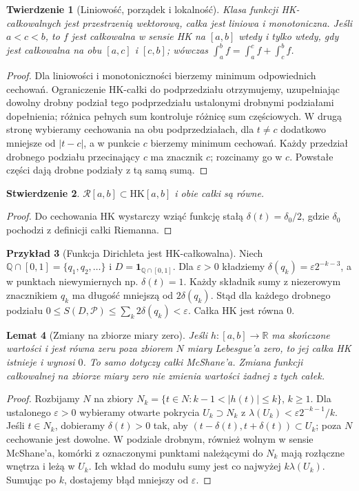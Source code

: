 \documentclass[11pt,a4paper]{article}
\numberwithin{equation}{section}
\theoremstyle{plain}
\newtheorem{twierdzenie}{Twierdzenie}[section]
\newtheorem{lemat}[twierdzenie]{Lemat}
\newtheorem{stwierdzenie}[twierdzenie]{Stwierdzenie}
\theoremstyle{definition}
\newtheorem{przyklad}[twierdzenie]{Przykład}
\theoremstyle{remark}
\newcommand{\R}{\mathbb R}
\newcommand{\Q}{\mathbb Q}
\newcommand{\ind}[1]{\mathbf 1_{#1}}
\newcommand{\HK}{\mathrm{HK}}
\begin{document}
\begin{twierdzenie}[Liniowość, porządek i lokalność]
Klasa funkcji HK-całkowalnych jest przestrzenią wektorową, całka jest liniowa i monotoniczna. Jeśli $a<c<b$, to $f$ jest całkowalna w sensie HK na $[a,b]$ wtedy i tylko wtedy, gdy jest całkowalna na obu $[a,c]$ i $[c,b]$; wówczas $\int_a^b f=\int_a^c f+\int_c^b f$.
\end{twierdzenie}
\begin{proof}
Dla liniowości i monotoniczności bierzemy minimum odpowiednich cechowań. Ograniczenie HK-całki do podprzedziału otrzymujemy, uzupełniając dowolny drobny podział tego podprzedziału ustalonymi drobnymi podziałami dopełnienia; różnica pełnych sum kontroluje różnicę sum częściowych. W drugą stronę wybieramy cechowania na obu podprzedziałach, dla $t\ne c$ dodatkowo mniejsze od $|t-c|$, a w punkcie $c$ bierzemy minimum cechowań. Każdy przedział drobnego podziału przecinający $c$ ma znacznik $c$; rozcinamy go w $c$. Powstałe części dają drobne podziały z tą samą sumą.
\end{proof}
\begin{stwierdzenie}
$\mathcal R[a,b]\subset\HK[a,b]$ i obie całki są równe.
\end{stwierdzenie}
\begin{proof}
Do cechowania HK wystarczy wziąć funkcję stałą $\delta(t)=\delta_0/2$, gdzie $\delta_0$ pochodzi z definicji całki Riemanna.
\end{proof}
\begin{przyklad}[Funkcja Dirichleta jest HK-całkowalna]
Niech $\Q\cap[0,1]=\{q_1,q_2,\dots\}$ i $D=\ind{\Q\cap[0,1]}$. Dla $\varepsilon>0$ kładziemy $\delta(q_k)=\varepsilon 2^{-k-3}$, a w punktach niewymiernych np. $\delta(t)=1$. Każdy składnik sumy z niezerowym znacznikiem $q_k$ ma długość mniejszą od $2\delta(q_k)$. Stąd dla każdego drobnego podziału $0\le S(D,\mathcal P)\le\sum_k 2\delta(q_k)<\varepsilon$. Całka HK jest równa $0$.
\end{przyklad}
\begin{lemat}[Zmiany na zbiorze miary zero]
Jeśli $h:[a,b]\to\R$ ma skończone wartości i jest równa zeru poza zbiorem $N$ miary Lebesgue'a zero, to jej całka HK istnieje i wynosi $0$. To samo dotyczy całki McShane'a. Zmiana funkcji całkowalnej na zbiorze miary zero nie zmienia wartości żadnej z tych całek.
\end{lemat}
\begin{proof}
Rozbijamy $N$ na zbiory $N_k=\{t\in N:k-1<|h(t)|\le k\}$, $k\ge1$. Dla ustalonego $\varepsilon>0$ wybieramy otwarte pokrycia $U_k\supset N_k$ z $\lambda(U_k)<\varepsilon2^{-k-1}/k$. Jeśli $t\in N_k$, dobieramy $\delta(t)>0$ tak, aby $(t-\delta(t),t+\delta(t))\subset U_k$; poza $N$ cechowanie jest dowolne. W podziale drobnym, również wolnym w sensie McShane'a, komórki z oznaczonymi punktami należącymi do $N_k$ mają rozłączne wnętrza i leżą w $U_k$. Ich wkład do modułu sumy jest co najwyżej $k\lambda(U_k)$. Sumując po $k$, dostajemy błąd mniejszy od $\varepsilon$.
\end{proof}
\end{document}
